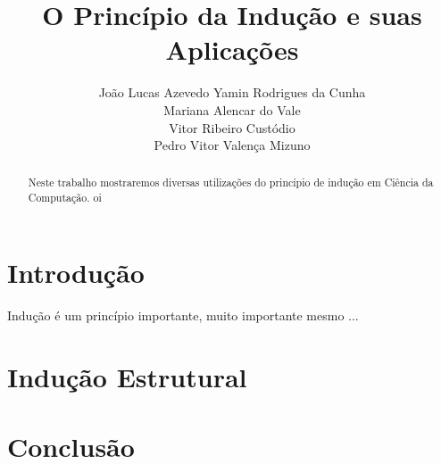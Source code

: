 \documentclass[a4paper, 10pt]{article}
\title{\LARGE \bf
O Princípio da Indução e suas Aplicações
}
\author{João Lucas Azevedo Yamin Rodrigues da Cunha \\
		Mariana Alencar do Vale \\
        Vitor Ribeiro Custódio \\
        Pedro Vitor Valença Mizuno}
\begin{document}
\maketitle

\begin{abstract}

Neste trabalho mostraremos diversas utilizações do princípio de indução em Ciência da Computação. oi

\end{abstract}

\section{Introdução}

Indução é um princípio importante, muito importante mesmo ...

\section{Indução Estrutural}

\section{Conclusão}
\end{document}
